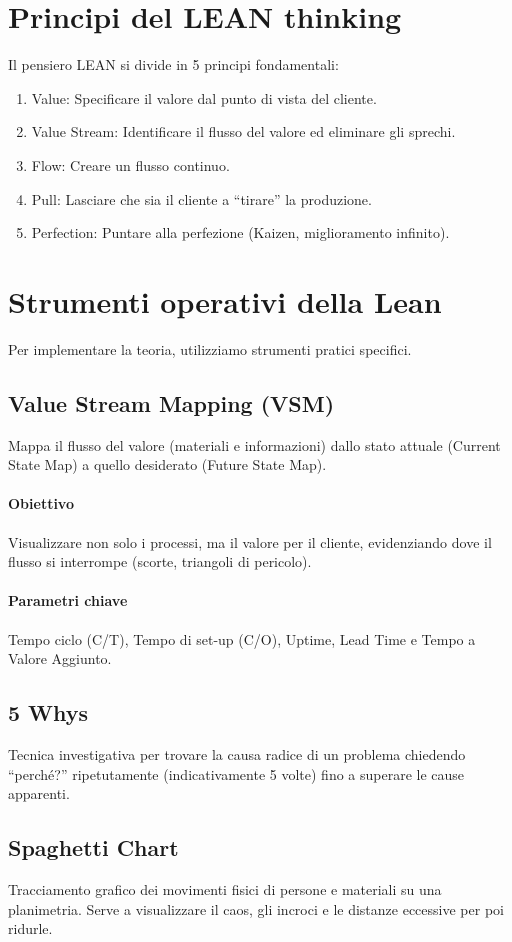 %
\section{Principi del LEAN thinking}
Il pensiero LEAN si divide in 5 principi fondamentali:
\begin{enumerate}
    \item Value: Specificare il valore dal punto di vista del cliente.
    \item Value Stream: Identificare il flusso del valore ed eliminare gli sprechi.
    \item Flow: Creare un flusso continuo.
    \item Pull: Lasciare che sia il cliente a ``tirare'' la produzione.
    \item Perfection: Puntare alla perfezione (Kaizen, miglioramento infinito).
\end{enumerate}

%
\section{Strumenti operativi della Lean}
Per implementare la teoria, utilizziamo strumenti pratici specifici.
\subsection{Value Stream Mapping (VSM)}
Mappa il flusso del valore (materiali e informazioni) dallo stato attuale (Current State Map) a quello desiderato (Future State Map).
%
\paragraph{Obiettivo} Visualizzare non solo i processi, ma il valore per il cliente, evidenziando dove il flusso si interrompe (scorte, triangoli di pericolo).
%
\paragraph{Parametri chiave} Tempo ciclo (C/T), Tempo di set-up (C/O), Uptime, Lead Time e Tempo a Valore Aggiunto.

%
\subsection{5 Whys}
Tecnica investigativa per trovare la causa radice di un problema chiedendo ``perché?'' ripetutamente (indicativamente 5 volte) fino a superare le cause apparenti.

%
\subsection{Spaghetti Chart}
Tracciamento grafico dei movimenti fisici di persone e materiali su una planimetria. Serve a visualizzare il caos, gli incroci e le distanze eccessive per poi ridurle.

